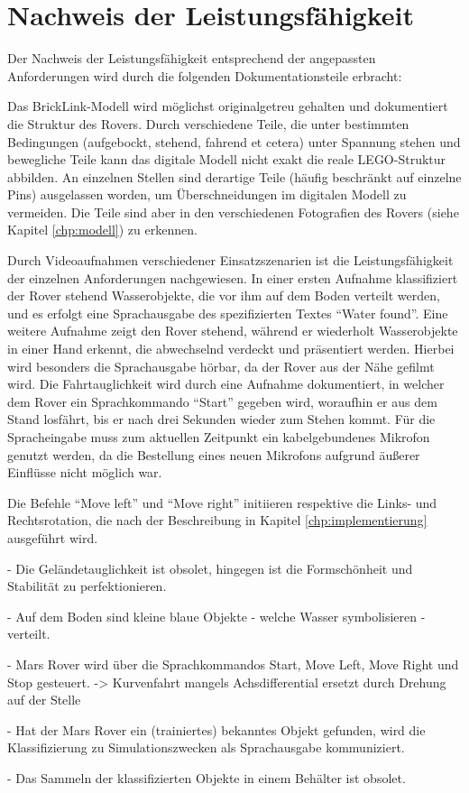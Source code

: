 \chapter{Nachweis der Leistungsfähigkeit}
\label{chp:nachweis_leistungsfaehigkeit}

Der Nachweis der Leistungsfähigkeit entsprechend der angepassten Anforderungen wird durch die folgenden Dokumentationsteile erbracht:

Das BrickLink-Modell wird möglichst originalgetreu gehalten und dokumentiert die Struktur des Rovers.
Durch verschiedene Teile, die unter bestimmten Bedingungen (aufgebockt, stehend, fahrend et cetera) unter Spannung stehen und bewegliche Teile kann das digitale Modell nicht exakt die reale LEGO-Struktur abbilden.
An einzelnen Stellen sind derartige Teile (häufig beschränkt auf einzelne Pins) ausgelassen worden, um Überschneidungen im digitalen Modell zu vermeiden.
Die Teile sind aber in den verschiedenen Fotografien des Rovers (siehe Kapitel \ref{chp:modell}) zu erkennen.

Durch Videoaufnahmen verschiedener Einsatzszenarien ist die Leistungsfähigkeit der einzelnen Anforderungen nachgewiesen.
In einer ersten Aufnahme klassifiziert der Rover stehend Wasserobjekte, die vor ihm auf dem Boden verteilt werden, und es erfolgt eine Sprachausgabe des spezifizierten Textes \enquote{Water found}.
Eine weitere Aufnahme zeigt den Rover stehend, während er wiederholt Wasserobjekte in einer Hand erkennt, die abwechselnd verdeckt und präsentiert werden.
Hierbei wird besonders die Sprachausgabe hörbar, da der Rover aus der Nähe gefilmt wird.
Die Fahrtauglichkeit wird durch eine Aufnahme dokumentiert, in welcher dem Rover ein Sprachkommando \enquote{Start} gegeben wird, woraufhin er aus dem Stand losfährt, bis er nach drei Sekunden wieder zum Stehen kommt.
Für die Spracheingabe muss zum aktuellen Zeitpunkt ein kabelgebundenes Mikrofon genutzt werden, da die Bestellung eines neuen Mikrofons aufgrund äußerer Einflüsse nicht möglich war.

Die Befehle \enquote{Move left} und \enquote{Move right} initiieren respektive die Links- und Rechtsrotation, die nach der Beschreibung in Kapitel \ref{chp:implementierung} ausgeführt wird.

- Die Geländetauglichkeit ist obsolet, hingegen ist die Formschönheit und Stabilität zu perfektionieren.

- Auf dem Boden sind kleine blaue Objekte - welche Wasser symbolisieren - verteilt.

- Mars Rover wird über die Sprachkommandos Start, Move Left, Move Right und Stop gesteuert. -> Kurvenfahrt mangels Achsdifferential ersetzt durch Drehung auf der Stelle

- Hat der Mars Rover ein (trainiertes) bekanntes Objekt gefunden, wird die Klassifizierung zu Simulationszwecken als Sprachausgabe kommuniziert.

- Das Sammeln der klassifizierten Objekte in einem Behälter ist obsolet.